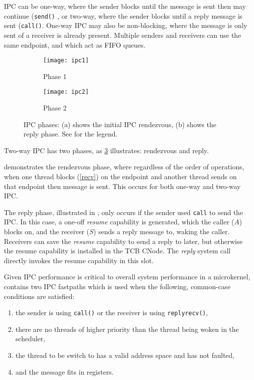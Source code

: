 IPC can be one-way, where the sender blocks until the message is sent then may continue
(\texttt{send()} , or two-way,
where the sender blocks until a reply message is sent (\texttt{call()}. One-way IPC may also be
non-blocking, where the message is only sent of a receiver is already present.
Multiple senders and receivers can use the same endpoint, and which act as \gls{FIFO}
queues. 

\begin{figure}
    \centering
    \begin{subfigure}[b]{0.49\textwidth}
        \centering
        \texttt{[image: ipc1]}
        \caption{Phase 1}
        \label{f:ipc1}
    \end{subfigure}%
    \begin{subfigure}[b]{0.49\textwidth}
        \centering
        \texttt{[image: ipc2]}
        \caption{Phase 2}
        \label{f:ipc2}
    \end{subfigure}
    \label{f:ipc}
    \caption{IPC phases: (a) shows the initial IPC rendezvous, (b) shows the
    reply phase. See  for the legend.}
\end{figure}

Two-way IPC has two phases, as \cref{f:ipc} illustrates: rendezvous and reply.

 demonstrates the rendezvous phase, where regardless of the order of operations, 
when one thread blocks (\cref{recv}) on the endpoint and another thread sends on that endpoint
then message is sent. This occurs for both one-way and two-way \gls{IPC}.

The reply phase, illustrated in , only occurs if the sender used \texttt{call} to send
the \gls{IPC}. In this case, a one-off \emph{resume} capability is generated, which the caller ($A$)
blocks on, and the receiver ($S$) sends a reply message to, waking the caller. Receivers can save
the \emph{resume} capability to send a reply to later, but otherwise the resume capability is
installed in the \gls{TCB} CNode. The \emph{reply} system call directly invokes the resume
capability in this slot. 

Given \gls{IPC} performance is critical to overall system performance in a microkernel, \selfour
contains two \gls{IPC} fastpaths which is used when the following, common-case conditions are satisfied:

\begin{enumerate}
    \item the sender is using \texttt{call()} or the receiver is using \texttt{replyrecv()},
    \item there are no threads of higher priority than the thread being woken in the scheduler,
    \item the thread to be switch to has a valid address space and has not faulted,
    \item and the message fits in registers.
\end{enumerate}

